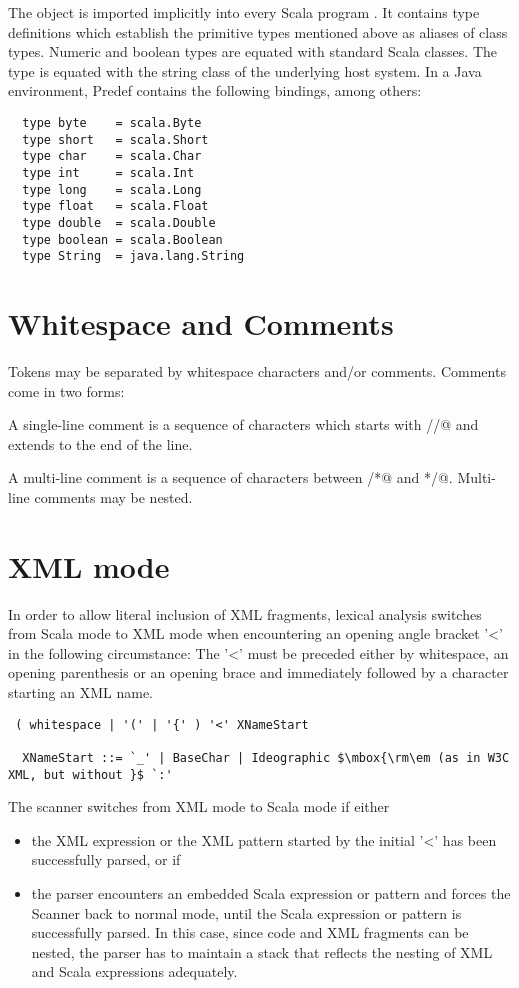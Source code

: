 The object \lstinline@Predef@ is imported implicitly into every Scala
program . It contains type definitions which establish the primitive
types mentioned above as aliases of class types. Numeric and boolean
types are equated with standard Scala classes. The \lstinline@String@
type is equated with the string class of the underlying host
system. In a Java environment, Predef contains the following bindings,
among others:
\begin{lstlisting}
  type byte    = scala.Byte
  type short   = scala.Short
  type char    = scala.Char
  type int     = scala.Int
  type long    = scala.Long
  type float   = scala.Float
  type double  = scala.Double
  type boolean = scala.Boolean
  type String  = java.lang.String
\end{lstlisting}

\section{Whitespace and Comments}

Tokens may be separated by whitespace characters
and/or comments. Comments come in two forms:

A single-line comment is a sequence of characters which starts with
\lstinline@//@ and extends to the end of the line.

A multi-line comment is a sequence of characters between \lstinline@/*@ and
\lstinline@*/@. Multi-line comments may be nested.

\section{XML mode\label{sec::xmlMode}}

In order to allow literal inclusion of XML fragments, lexical analysis
switches from Scala mode to XML mode when encountering an opening
angle bracket '<' in the following circumstance: The '<' must be
preceded either by whitespace, an opening parenthesis or an opening
brace and immediately followed by a character starting an XML name.

\syntax\begin{lstlisting}
 ( whitespace | '(' | '{' ) '<' XNameStart

  XNameStart ::= `_' | BaseChar | Ideographic $\mbox{\rm\em (as in W3C XML, but without }$ `:'
\end{lstlisting}

The scanner switches from XML mode to Scala mode if either
\begin{itemize}
\item the XML expression or the XML pattern started by the initial '<' has been 
successfully parsed, or if

\item the parser encounters an embedded Scala expression or pattern and 
forces the Scanner 
back to normal mode, until the Scala expression or pattern is
successfully parsed. In this case, since code and XML fragments can be
nested, the parser has to maintain a stack that reflects the nesting
of XML and Scala expressions adequately.
\end{itemize}

